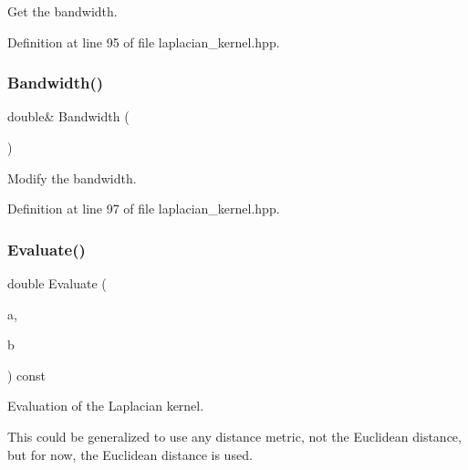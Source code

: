 Get the bandwidth. 



Definition at line 95 of file laplacian\+\_\+kernel.\+hpp.

\mbox{\label{classmlpack_1_1kernel_1_1LaplacianKernel_a202e9a76b6f5f948e98e68a374ae8ea4}} 
\subsubsection{Bandwidth()\hspace{0.1cm}{\footnotesize\ttfamily [2/2]}}
{\footnotesize\ttfamily double\& Bandwidth (\begin{DoxyParamCaption}{ }\end{DoxyParamCaption})\hspace{0.3cm}{\ttfamily [inline]}}



Modify the bandwidth. 



Definition at line 97 of file laplacian\+\_\+kernel.\+hpp.

\mbox{\label{classmlpack_1_1kernel_1_1LaplacianKernel_a84c3aeba25ea7703bd2d4f85a54301da}} 
\subsubsection{Evaluate()\hspace{0.1cm}{\footnotesize\ttfamily [1/2]}}
{\footnotesize\ttfamily double Evaluate (\begin{DoxyParamCaption}\item[{const Vec\+TypeA \&}]{a,  }\item[{const Vec\+TypeB \&}]{b }\end{DoxyParamCaption}) const\hspace{0.3cm}{\ttfamily [inline]}}



Evaluation of the Laplacian kernel. 

This could be generalized to use any distance metric, not the Euclidean distance, but for now, the Euclidean distance is used.


